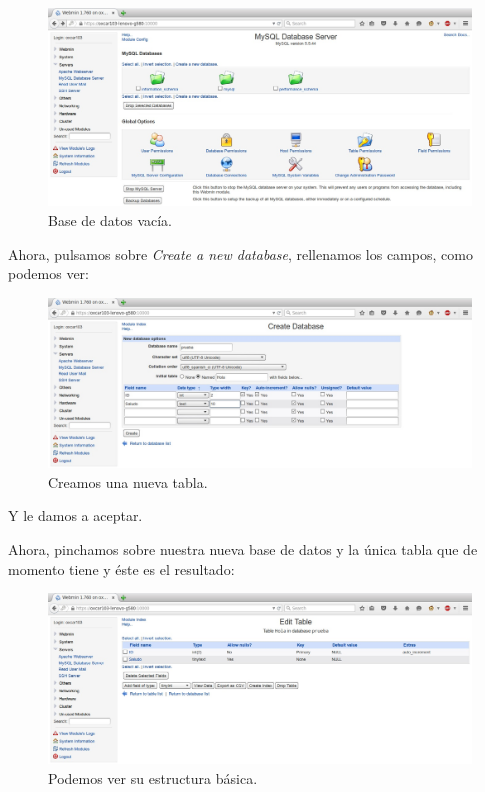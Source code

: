 \documentclass[paper=a4, fontsize=11pt]{scrartcl} %
\numberwithin{equation}{section} %
\numberwithin{figure}{section} %
\numberwithin{table}{section} %
\begin{document}
\begin{enumerate}
		\begin{figure}[H]
			\centering
			\includegraphics[width=15cm]{Ejercicio_19a.jpg}
			\caption{Base de datos vacía.}
			\label{fig:initial}
		\end{figure}
		
		Ahora, pulsamos sobre \textit{Create a new database}, rellenamos los campos, como podemos ver:
		
		\begin{figure}[H]
			\centering
			\includegraphics[width=15cm]{Ejercicio_19b.jpg}
			\caption{Creamos una nueva tabla.}
			\label{fig:new}
		\end{figure}
		
		Y le damos a aceptar.
		
		Ahora, pinchamos sobre nuestra nueva base de datos y la única tabla que de momento tiene y
		éste es el resultado:
		
		\begin{figure}[H]
			\centering
			\includegraphics[width=15cm]{Ejercicio_19c.jpg}
			\caption{Podemos ver su estructura básica.}
			\label{fig:created}
		\end{figure}
		

\end{enumerate}
\end{document}
